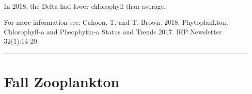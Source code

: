 \documentclass[
]{book}
\begin{document}
\begin{panel-grid}
\begin{columns-nocenter}
\begin{column800}
\end{column800}

\begin{column40}

~

\end{column40}

\begin{column800}

In 2018, the Delta had lower chlorophyll than average.

\end{column800}

\end{columns-nocenter}

\end{panel-grid}

\begin{disclaimer}
For more information see: Cahoon, T. and T. Brown. 2018. Phytoplankton,
Chlorophyll-a and Pheophytin-a Status and Trends 2017. IEP Newsletter
32(1):14-20.
\end{disclaimer}

\begin{center}\rule{0.5\linewidth}{0.5pt}\end{center}

\hypertarget{fall-zooplankton}{%
\section{Fall Zooplankton}\label{fall-zooplankton}}
\end{document}
